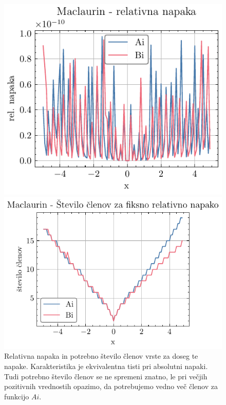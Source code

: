\documentclass[slovene,11pt,a4paper]{article}
\begin{document}
\begin{figure}[ht]
  \centering
  \begin{minipage}{0.42\textwidth}
    \centering
    \includegraphics[width=\linewidth]{graphs/mac_rel_err.pdf}
  \end{minipage}\hfill
  \begin{minipage}{0.48\textwidth}
    \centering
    \includegraphics[width=\linewidth]{graphs/mac_rel_err_n.pdf}
  \end{minipage}
  \caption{Relativna napaka in potrebno število členov vrste za doseg te napake. Karakteristika je ekvivalentna tisti pri absolutni napaki. Tudi potrebno število členov se ne spremeni znatno, le pri večjih pozitivnih vrednostih opazimo, da potrebujemo vedno več členov za funkcijo $Ai$.}
  \label{fig: mac_rel_err}
\end{figure}
\end{document}
